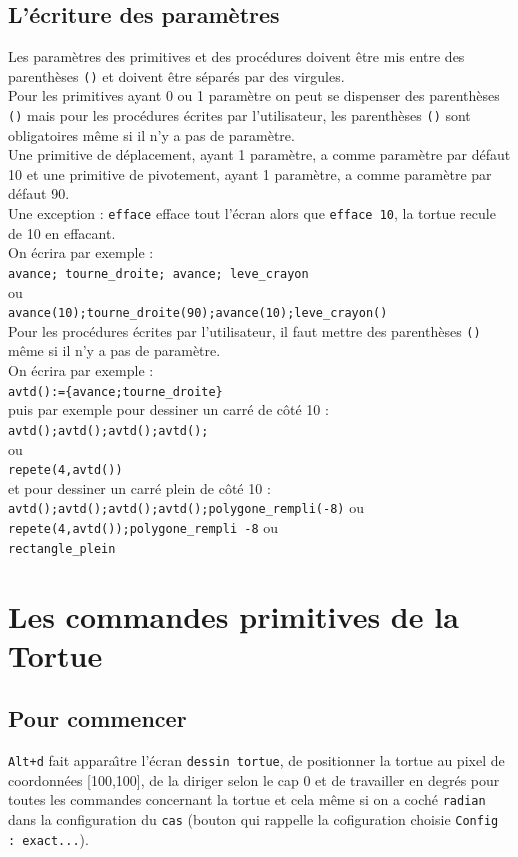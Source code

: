 \documentclass[a4paper,11pt]{book}
\begin{document}
\section{L'\'ecriture des param\`etres}
Les param\`etres des primitives et des proc\'edures doivent \^etre mis entre 
des parenth\`eses {\tt ()} et doivent \^etre s\'epar\'es par des virgules.\\
Pour les primitives ayant 0 ou 1 param\`etre on peut se dispenser des 
parenth\`eses {\tt ()} mais pour les proc\'edures \'ecrites par l'utilisateur,
les parenth\`eses {\tt ()} sont obligatoires m\^eme si il n'y a pas de 
param\`etre.\\
Une primitive de d\'eplacement, ayant 1 param\`etre, a 
comme param\`etre par d\'efaut 10 et une primitive de pivotement, ayant 1 
param\`etre, a comme param\`etre par d\'efaut 90.\\
Une exception : {\tt efface} efface tout l'\'ecran alors que {\tt efface 10},
la tortue recule de 10 en effacant.\\
On \'ecrira par exemple :\\
{\tt avance; tourne\_droite; avance; leve\_crayon}\\
ou\\
{\tt avance(10);tourne\_droite(90);avance(10);leve\_crayon()}\\
Pour les proc\'edures \'ecrites par l'utilisateur, il faut
mettre des parenth\`eses {\tt ()} m\^eme si il n'y a pas de param\`etre.\\
On \'ecrira par exemple :\\
{\tt avtd():=\{avance;tourne\_droite\}}\\
puis par exemple pour dessiner un carr\'e de c\^ot\'e 10 : \\
{\tt avtd();avtd();avtd();avtd();}\\
ou\\
{\tt repete(4,avtd())}\\
et   pour dessiner un carr\'e plein de c\^ot\'e 10 : \\
{\tt avtd();avtd();avtd();avtd();polygone\_rempli(-8)}
ou\\
{\tt repete(4,avtd());polygone\_rempli -8}
ou \\ 
{\tt rectangle\_plein} 

\chapter{Les commandes primitives de la Tortue}
\section{Pour commencer}\label{sec:init}
{\tt Alt+d} fait appara\^{\i}tre  l'\'ecran {\tt dessin tortue}, de positionner
la tortue au pixel de coordonn\'ees [100,100], de la diriger selon  le cap 0 et
de travailler en degr\'es pour toutes les commandes concernant la tortue et 
cela m\^eme si on a coch\'e {\tt radian} dans la configuration du {\tt cas} 
(bouton qui rappelle la cofiguration choisie {\tt Config : exact...}).
\end{document}
